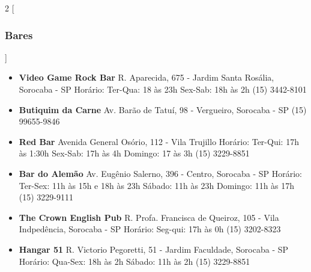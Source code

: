 \begin{multicols}{2}
  [
  \subsubsection{Bares}
  ]
  \begin{itemize}
    \item \textbf{Video Game Rock Bar}
      \newline R. Aparecida, 675 - Jardim Santa Rosália, Sorocaba - SP
      \newline Horário: Ter-Qua: 18 às 23h Sex-Sab: 18h às 2h
      \newline (15) 3442-8101
  \end{itemize}
  \begin{itemize}
    \item \textbf{Butiquim da Carne}
      \newline Av. Barão de Tatuí, 98 - Vergueiro, Sorocaba - SP
      \newline (15) 99655-9846
  \end{itemize}
  \begin{itemize}
    \item \textbf{Red Bar}
      \newline Avenida General Osório, 112 - Vila Trujillo
      \newline Horário: Ter-Qui: 17h às 1:30h
      \newline Sex-Sab: 17h às 4h
      \newline Domingo: 17 às 3h
      \newline (15) 3229-8851
  \end{itemize}
  \begin{itemize}
    \item \textbf{Bar do Alemão}
      \newline Av. Eugênio Salerno, 396 - Centro, Sorocaba - SP
      \newline Horário: Ter-Sex: 11h às 15h e 18h às 23h
      \newline Sábado: 11h às 23h Domingo: 11h às 17h
      \newline (15) 3229-9111
  \end{itemize}
  \begin{itemize}
    \item \textbf{The Crown English Pub}
      \newline R. Profa. Francisca de Queiroz, 105 - Vila Indpedência, Sorocaba - SP
      \newline Horário: Seg-qui: 17h às 0h
      \newline (15) 3202-8323
  \end{itemize}
  \begin{itemize}
    \item \textbf{Hangar 51}
      \newline R. Victorio Pegoretti, 51 - Jardim Faculdade, Sorocaba - SP
      \newline Horário: Qua-Sex: 18h às 2h
      \newline Sábado: 11h às 2h
      \newline (15) 3229-8851
  \end{itemize}
\end{multicols}

